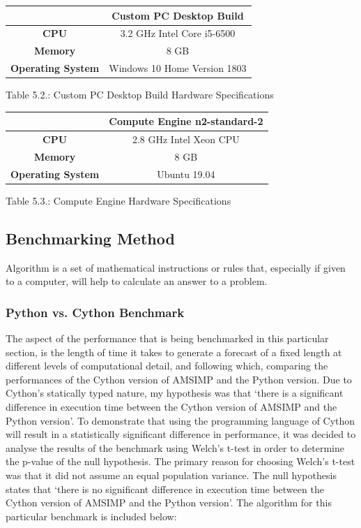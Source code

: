 \begin{center}
\begin{tabular}{|c|c|} 
 \hline
  & Custom PC Desktop Build \\
 \hline
 \textbf{CPU} &  3.2 GHz Intel Core i5-6500 \\
 \hline
 \textbf{Memory} & 8 GB \\
 \hline
 \textbf{Operating System} & Windows 10 Home Version 1803 \\
 \hline
\end{tabular}\par
\bigskip
Table 5.2.: Custom PC Desktop Build Hardware Specifications
\end{center}

\begin{center}
\begin{tabular}{|c|c|} 
 \hline
  & Compute Engine n2-standard-2 \\
 \hline
 \textbf{CPU} & 2.8 GHz Intel Xeon CPU \\
 \hline
 \textbf{Memory} & 8 GB \\
 \hline
 \textbf{Operating System} & Ubuntu 19.04 \\
 \hline
\end{tabular}\par
\bigskip
Table 5.3.: Compute Engine Hardware Specifications
\end{center}

\subsection{Benchmarking Method}
\begin{definition}
Algorithm is a set of mathematical instructions or rules that, especially if given to a computer, will help to calculate an answer to a problem.
\end{definition}

\subsubsection{Python vs. Cython Benchmark}
The aspect of the performance that is being benchmarked in this particular section, is the length of time it takes to generate a forecast of a fixed length at different levels of computational detail, and following which, comparing the performances of the Cython version of AMSIMP and the Python version. Due to Cython's statically typed nature, my hypothesis was that `there is a significant difference in execution time between the Cython version of AMSIMP and the Python version'. To demonstrate that using the programming language of Cython will result in a statistically significant difference in performance, it was decided to analyse the results of the benchmark using Welch's t-test in order to determine the p-value of the null hypothesis. The primary reason for choosing Welch's t-test was that it did not assume an equal population variance. The null hypothesis states that `there is no significant difference in execution time between the Cython version of AMSIMP and the Python version'. The algorithm for this particular benchmark is included below:

